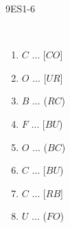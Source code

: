 \documentclass[a4paper,12pt]{report}
\begin{document}
\begin{EXO}{}{9ES1-6}
\begin{tikzpicture}[baseline]
\end{tikzpicture}\\\begin{multicols}{4}
\begin{enumerate}[]
	\item \begin{minipage}[t]{\linewidth} $C$ $\ldots{}$ [$CO$] \end{minipage}
	\item \begin{minipage}[t]{\linewidth} $O$ $\ldots{}$ [$UR$] \end{minipage}
	\item \begin{minipage}[t]{\linewidth} $B$ $\ldots{}$ ($RC$) \end{minipage}
	\item \begin{minipage}[t]{\linewidth} $F$ $\ldots{}$ [$BU$) \end{minipage}
	\item \begin{minipage}[t]{\linewidth} $O$ $\ldots{}$ ($BC$) \end{minipage}
	\item \begin{minipage}[t]{\linewidth} $C$ $\ldots{}$ [$BU$) \end{minipage}
	\item \begin{minipage}[t]{\linewidth} $C$ $\ldots{}$ [$RB$] \end{minipage}
	\item \begin{minipage}[t]{\linewidth} $U$ $\ldots{}$ ($FO$) \end{minipage}
\end{enumerate}
\end{multicols}
\end{EXO}
\end{document}
